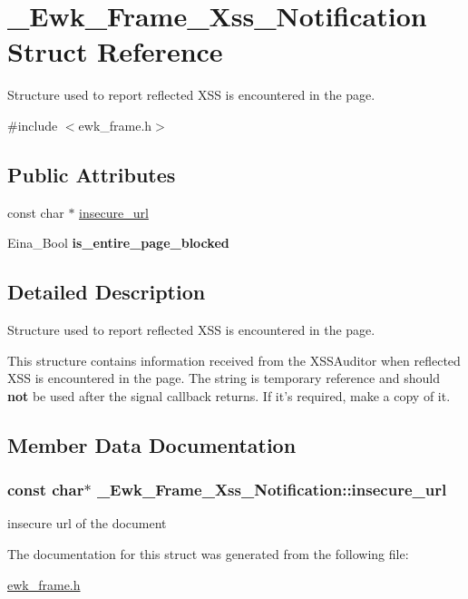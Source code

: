 \hypertarget{struct__Ewk__Frame__Xss__Notification}{\section{\+\_\+\+Ewk\+\_\+\+Frame\+\_\+\+Xss\+\_\+\+Notification Struct Reference}
\label{struct__Ewk__Frame__Xss__Notification}
}


Structure used to report reflected X\+S\+S is encountered in the page.  




{\ttfamily \#include $<$ewk\+\_\+frame.\+h$>$}

\subsection*{Public Attributes}
\begin{DoxyCompactItemize}
\item 
const char $\ast$ \hyperlink{struct__Ewk__Frame__Xss__Notification_ad5ea7a848d09860e903efd63b121ff0e}{insecure\+\_\+url}
\item 
\hypertarget{struct__Ewk__Frame__Xss__Notification_a82b1238b7d2c7360707859c7628fbc2f}{Eina\+\_\+\+Bool {\bfseries is\+\_\+entire\+\_\+page\+\_\+blocked}}\label{struct__Ewk__Frame__Xss__Notification_a82b1238b7d2c7360707859c7628fbc2f}

\end{DoxyCompactItemize}


\subsection{Detailed Description}
Structure used to report reflected X\+S\+S is encountered in the page. 

This structure contains information received from the X\+S\+S\+Auditor when reflected X\+S\+S is encountered in the page. The string is temporary reference and should {\bfseries not} be used after the signal callback returns. If it's required, make a copy of it. 

\subsection{Member Data Documentation}
\hypertarget{struct__Ewk__Frame__Xss__Notification_ad5ea7a848d09860e903efd63b121ff0e}{
\subsubsection[{insecure\+\_\+url}]{\setlength{\rightskip}{0pt plus 5cm}const char$\ast$ \+\_\+\+Ewk\+\_\+\+Frame\+\_\+\+Xss\+\_\+\+Notification\+::insecure\+\_\+url}}\label{struct__Ewk__Frame__Xss__Notification_ad5ea7a848d09860e903efd63b121ff0e}
insecure url of the document 

The documentation for this struct was generated from the following file\+:\begin{DoxyCompactItemize}
\item 
\hyperlink{ewk__frame_8h}{ewk\+\_\+frame.\+h}\end{DoxyCompactItemize}
